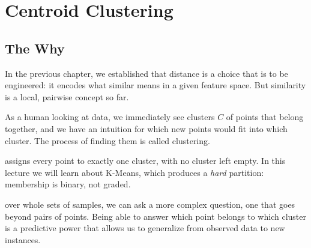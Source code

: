 



\chapter{Centroid Clustering}


\section{The Why}

In the previous chapter, we established that distance is a choice that is to be engineered\cite{Bishop2006}:
it encodes what similar means in a given feature space. 
But similarity is a local, pairwise concept so far. 

As a human looking at data, we immediately see clusters $C$ of points that belong together,
and we have an intuition for which new points would fit into which cluster.
The process of finding them is called clustering.

 assigns every point to exactly one cluster, with no cluster left empty.
In this lecture we will learn about K-Means\cite{MacQueen1967}, which produces a \emph{hard} partition:
membership is binary, not graded.


 over whole sets of samples, we can ask a more complex question,
one that goes beyond pairs of points. Being able to answer which point belongs 
to which cluster is a predictive power that allows us to generalize from observed data 
to new instances. 

